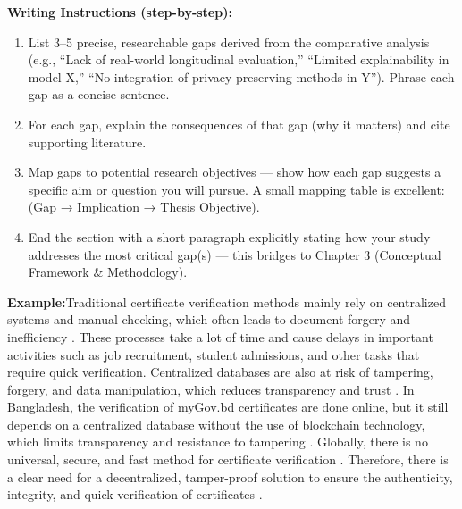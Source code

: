{\color{red}\textbf{Writing Instructions (step-by-step):}
\begin{enumerate}
    \item List 3–5 precise, researchable gaps derived from the comparative analysis (e.g., ``Lack of real-world longitudinal evaluation,'' ``Limited explainability in model X,'' ``No integration of privacy preserving methods in Y''). Phrase each gap as a concise sentence.
    
    \item For each gap, explain the consequences of that gap (why it matters) and cite supporting literature.
    
    \item Map gaps to potential research objectives — show how each gap suggests a specific aim or question you will pursue. A small mapping table is excellent: (Gap → Implication → Thesis Objective).
    
    \item End the section with a short paragraph explicitly stating how your study addresses the most critical gap(s) — this bridges to Chapter 3 (Conceptual Framework \& Methodology).
\end{enumerate}}



\textbf{ \color{blue} Example:}Traditional certificate verification methods mainly rely on centralized systems and manual checking, which often leads to document forgery and inefficiency \cite{Aloqaily2020, Rahman2023}. These processes take a lot of time and cause delays in important activities such as job recruitment, student admissions, and other tasks that require quick verification. Centralized databases are also at risk of tampering, forgery, and data manipulation, which reduces transparency and trust \cite{Rahman2023}. In Bangladesh, the verification of myGov.bd certificates are done online, but it still depends on a centralized database without the use of blockchain technology, which limits transparency and resistance to tampering \cite{Rustemi2023} . Globally, there is no universal, secure, and fast method for certificate verification \cite{Ankit2023}. Therefore, there is a clear need for a decentralized, tamper-proof solution to ensure the authenticity, integrity, and quick verification of certificates  \cite{Sun2021}.
